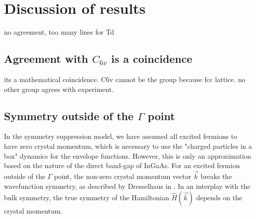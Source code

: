\section{Discussion of results}

no agreement, too many lines for Td

\subsection{Agreement with $C_{6v}$ is a coincidence}
its a mathematical coincidence. C6v cannot be the group because fcc lattice. no other group agrees with experiment.


\subsection{Symmetry outside of the $\Gamma$ point}
In the symmetry suppression model, we have assumed all excited fermions to have zero crystal momentum, which is necessary to use the "charged particles in a box" dynamics for the envelope functions. However, this is only an approximation based on the nature of the direct band-gap of InGaAs. For an excited fermion outside of the $\Gamma$ point, the non-zero crystal momentum vector $\vec{k}$ breaks the wavefunction symmetry, as described by Dresselhaus in \cite[Ch. 13]{dresselhaus}. In an interplay with the bulk symmetry, the true symmetry of the Hamiltonian $\hat{H}\left(\vec{k}\right)$ depends on the crystal momentum.


